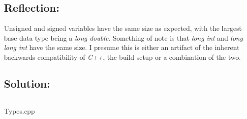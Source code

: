     \subsection*{Reflection:}
        Unsigned and signed variables have the same size as expected, with
        the largest base data type being a \textit{long double}.
        Something of note is that \textit{long int} and \textit{long long int} have the same size.
        I presume this is either an artifact of the inherent backwards compatibility of \textit{C++},
        the build setup or a combination of the two.

    \subsection*{Solution:}
        \begin{listing}[H]
            \inputminted[firstline=6]{cpp}{../Tasks/03-Types/Types.cpp}
            \caption{Types.cpp}
        \end{listing}